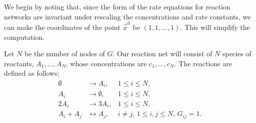 We begin by noting that, since the form of the rate equations for reaction networks are invariant under rescaling the concentrations and rate constants, we can make the coordinates of the point $\vec{x}^0$ be $(1,1,\ldots,1)$.  This will simplify the computation.

Let $N$ be the number of nodes of $G$.  Our reaction net will consist of $N$ species of reactants, $A_1, \ldots, A_N$, whose concentrations are $c_1, \ldots, c_N$.  The reactions are defined as follows:
\begin{equation}\label{eq:arbitraryjacobianreactionnetwork}
\begin{aligned}
\emptyset &\to A_i, & 1 \le i \le N,\\
A_i &\to \emptyset, & 1 \le i \le N,\\
2A_i &\to 3A_i, & 1 \le i \le N,\\
A_i + A_j &\leftrightarrow A_j, & i \neq j,\, 1 \le i,j \le N,\, G_{ij} = 1.
\end{aligned}
\end{equation}

